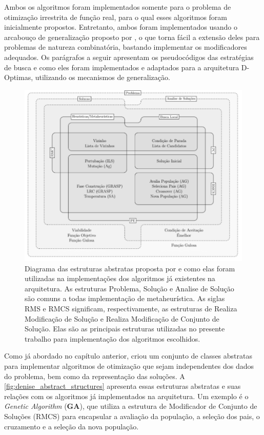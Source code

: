Ambos os algoritmos foram implementados somente para o problema de otimização irrestrita de função real, para o qual esses algoritmos foram inicialmente propostos. Entretanto, ambos foram implementados usando o arcabouço de generalização proposto por , o que torna fácil a extensão deles para problemas de natureza combinatória, bastando implementar os modificadores adequados. Os parágrafos a seguir apresentam os pseudocódigos das estratégias de busca e como eles foram implementados e adaptados para a arquitetura D-Optimas, utilizando os mecanismos de generalização. 

\begin{figure}[ht!]
    \centering
    \caption{Diagrama das estruturas abstratas proposta por  e como elas foram  utilizadas na implementações dos algoritmos já existentes na arquitetura. As estruturas Problema, Solução e Analise de Solução são comuns a todas implementação de metaheurística. As siglas RMS e RMCS significam, respectivamente, as estruturas de Realiza Modificação de Solução e Realiza Modificação de Conjunto de Solução. Elas são as principais estruturas utilizadas no presente trabalho para implementação dos algoritmos escolhidos. }
    \label{fig:denise_abstract_structures}
    \includegraphics[scale=0.5]{imagens/denise-abstract-structures.png}
\end{figure}

Como já abordado no capítulo anterior,  criou um conjunto de classes abstratas para implementar algoritmos de otimização que sejam independentes dos dados do problema, bem como da representação das soluções. A \autoref{fig:denise_abstract_structures} apresenta essas estruturas abstratas e suas relações com os algoritmos já implementados na arquitetura. Um exemplo é o \textit{Genetic Algorithm} (\textbf{GA}), que utiliza a estrutura de Modificador de Conjunto de Soluções (RMCS) para encapsular a avaliação da população, a seleção dos pais, o cruzamento e a seleção da nova população. 

